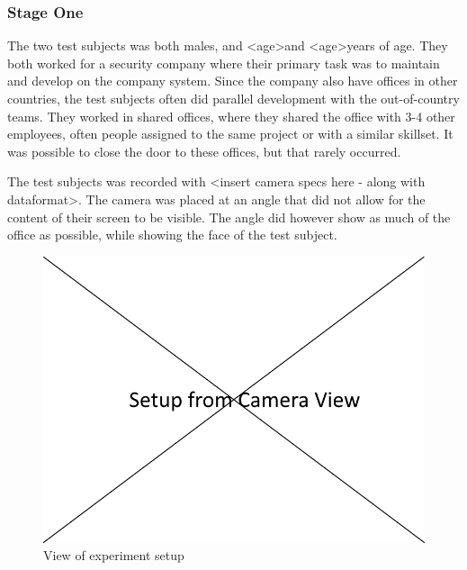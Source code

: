\documentclass{sigchi}
\begin{document}
\subsubsection{Stage One}
The two test subjects was both males, and \textless age\textgreater and \textless age\textgreater years of age.
They both worked for a security company where their primary task was to maintain and develop on the company system.
Since the company also have offices in other countries, the test subjects often did parallel development with the out-of-country teams.
They worked in shared offices, where they shared the office with 3-4 other employees, often people assigned to the same project or with a similar skillset.
It was possible to close the door to these offices, but that rarely occurred.

The test subjects was recorded with \textless insert camera specs here - along with dataformat\textgreater.
The camera was placed at an angle that did not allow for the content of their screen to be visible.
The angle did however show as much of the office as possible, while showing the face of the test subject.

\begin{figure}
  \centering
  \includegraphics[width=\columnwidth]{figures/experiment_setup.png}
  \caption{View of experiment setup}
  \label{fig:experiment}
\end{figure}
\end{document}
